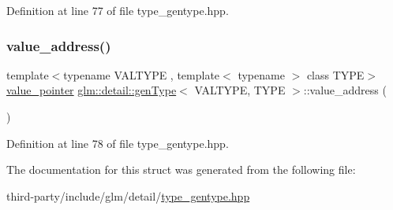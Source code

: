 Definition at line 77 of file type\+\_\+gentype.\+hpp.

\mbox{\label{structglm_1_1detail_1_1gen_type_a146973ec142766743080c1895a9e3c65}} 
\subsubsection{\texorpdfstring{value\+\_\+address()}{value\_address()}\hspace{0.1cm}{\footnotesize\ttfamily [2/2]}}
{\footnotesize\ttfamily template$<$typename V\+A\+L\+T\+Y\+PE , template$<$ typename $>$ class T\+Y\+PE$>$ \\
\hyperlink{structglm_1_1detail_1_1gen_type_a3b272e7be29ab920f2877c00646f6f9b}{value\+\_\+pointer} \hyperlink{structglm_1_1detail_1_1gen_type}{glm\+::detail\+::gen\+Type}$<$ V\+A\+L\+T\+Y\+PE, T\+Y\+PE $>$\+::value\+\_\+address (\begin{DoxyParamCaption}{ }\end{DoxyParamCaption})\hspace{0.3cm}{\ttfamily [inline]}}



Definition at line 78 of file type\+\_\+gentype.\+hpp.



The documentation for this struct was generated from the following file\+:\begin{DoxyCompactItemize}
\item 
third-\/party/include/glm/detail/\hyperlink{type__gentype_8hpp}{type\+\_\+gentype.\+hpp}\end{DoxyCompactItemize}
